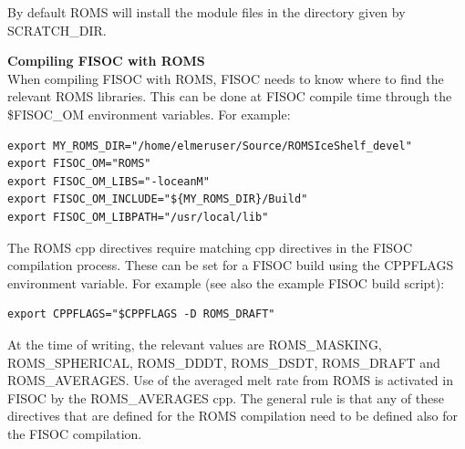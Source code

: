 \documentclass[11pt]{article}
\begin{document}
By default ROMS will install the module files in the directory given by 
 SCRATCH\_DIR.  

\vspace{10pt}
\textbf{Compiling FISOC with ROMS}\\
When compiling FISOC with ROMS, FISOC needs to know where to 
find the relevant ROMS libraries.  
This can be done at FISOC compile time through the 
\$FISOC\_OM
environment variables.  For example:

\begin{lstlisting}
export MY_ROMS_DIR="/home/elmeruser/Source/ROMSIceShelf_devel"
export FISOC_OM="ROMS"
export FISOC_OM_LIBS="-loceanM"
export FISOC_OM_INCLUDE="${MY_ROMS_DIR}/Build"
export FISOC_OM_LIBPATH="/usr/local/lib"
\end{lstlisting}

The ROMS cpp directives require matching cpp directives in the FISOC 
compilation process. 
These can be set for a FISOC build using the CPPFLAGS environment variable.
For example (see also the example FISOC build script):
\begin{lstlisting}
export CPPFLAGS="$CPPFLAGS -D ROMS_DRAFT"
\end{lstlisting}
At the time of writing, the relevant values are ROMS\_MASKING, ROMS\_SPHERICAL, 
ROMS\_DDDT, ROMS\_DSDT, ROMS\_DRAFT and ROMS\_AVERAGES. Use of the averaged melt rate from ROMS is activated in FISOC by the ROMS\_AVERAGES cpp. The general rule is that any of these directives that 
are defined for the ROMS compilation need to be defined also for the FISOC 
compilation. 







\end{document}
